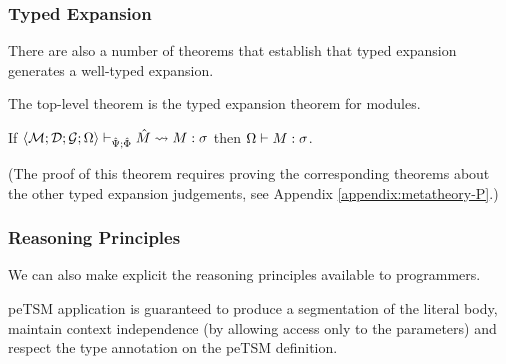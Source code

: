 \subsubsection{Typed Expansion}
There are also a number of theorems that establish that typed expansion generates a well-typed expansion.

The top-level theorem is the typed expansion theorem for modules. 

\begingroup
\def\thetheorem{\ref{thm:module-expansion-P}}
\begin{theorem}
If $\langle \mathcal{M}; \mathcal{D}; \mathcal{G}; \Omega \rangle \vdash_{\hat{\Psi}; \hat\Phi} {\hat M} \leadsto M : \sigma$ then $\Omega \vdash M : \sigma$.
\end{theorem}
\endgroup

(The proof of this theorem requires proving the corresponding theorems about the other typed expansion judgements, see Appendix \ref{appendix:metatheory-P}.)

\subsubsection{Reasoning Principles}
We can also make explicit the reasoning principles available to programmers.

peTSM application is guaranteed to produce a segmentation of the literal body, maintain context independence (by allowing access only to the parameters) and respect the type annotation on the peTSM definition.


